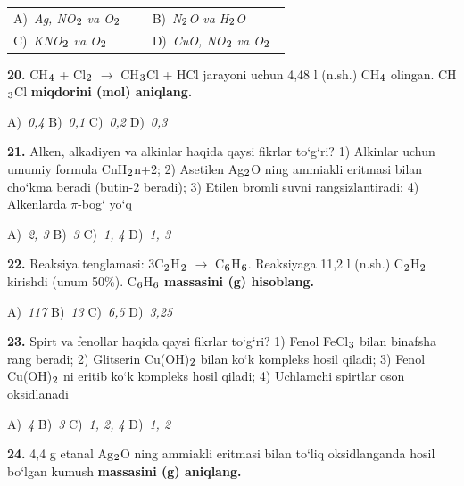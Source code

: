 \documentclass[11pt,a4paper]{article}
\renewcommand{\textsubscript}[1]{\ensuremath{_{\text{\fontsize{8}{8}\selectfont #1}}}}
\begin{document}
\begin{multicols}{2}
\noindent\begin{tabular}{@{}p{0.47\linewidth}@{}p{0.47\linewidth}@{}}
A)~\textsl{Ag, NO\textsubscript{2} va O\textsubscript{2}} & B)~\textsl{N\textsubscript{2}O va H\textsubscript{2}O} \\
C)~\textsl{KNO\textsubscript{2} va O\textsubscript{2}} & D)~\textsl{CuO, NO\textsubscript{2} va O\textsubscript{2}} \\
\end{tabular}\par
\vspace{4pt}
\noindent\textbf{20.} CH\textsubscript{4} + Cl\textsubscript{2} $\to$ CH\textsubscript{3}Cl + HCl jarayoni uchun 4,48 l (n.sh.) CH\textsubscript{4} olingan. CH\textsubscript{3}Cl \textbf{miqdorini (mol) aniqlang.}

\noindent A)~\textsl{0,4} \hfill B)~\textsl{0,1} \hfill C)~\textsl{0,2} \hfill D)~\textsl{0,3}\par
\vspace{4pt}
\noindent\textbf{21.} Alken, alkadiyen va alkinlar haqida qaysi fikrlar to`g`ri? 1) Alkinlar uchun umumiy formula CnH\textsubscript{2}n+2; 2) Asetilen Ag\textsubscript{2}O ning ammiakli eritmasi bilan cho`kma beradi (butin-2 beradi); 3) Etilen bromli suvni rangsizlantiradi; 4) Alkenlarda $\pi$-bog` yo`q

\noindent A)~\textsl{2, 3} \hfill B)~\textsl{3} \hfill C)~\textsl{1, 4} \hfill D)~\textsl{1, 3}\par
\vspace{4pt}
\noindent\textbf{22.} Reaksiya tenglamasi: 3C\textsubscript{2}H\textsubscript{2} $\to$ C\textsubscript{6}H\textsubscript{6}. Reaksiyaga 11,2 l (n.sh.) C\textsubscript{2}H\textsubscript{2} kirishdi (unum 50\%). C\textsubscript{6}H\textsubscript{6} \textbf{massasini (g) hisoblang.}

\noindent A)~\textsl{117} \hfill B)~\textsl{13} \hfill C)~\textsl{6,5} \hfill D)~\textsl{3,25}\par
\vspace{4pt}
\noindent\textbf{23.} Spirt va fenollar haqida qaysi fikrlar to`g`ri? 1) Fenol FeCl\textsubscript{3} bilan binafsha rang beradi; 2) Glitserin Cu(OH)\textsubscript{2} bilan ko`k kompleks hosil qiladi; 3) Fenol Cu(OH)\textsubscript{2} ni eritib ko`k kompleks hosil qiladi; 4) Uchlamchi spirtlar oson oksidlanadi

\noindent A)~\textsl{4} \hfill B)~\textsl{3} \hfill C)~\textsl{1, 2, 4} \hfill D)~\textsl{1, 2}\par
\vspace{4pt}
\noindent\textbf{24.} 4,4 g etanal Ag\textsubscript{2}O ning ammiakli eritmasi bilan to`liq oksidlanganda hosil bo`lgan kumush \textbf{massasini (g) aniqlang.}


\end{multicols}
\end{document}
